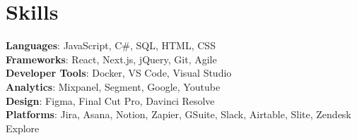 
\section{Skills}

\begin{itemize}[leftmargin=0.15in, label={}]
    \small{
      \item{
      \textbf{Languages}{: JavaScript, C\#, SQL, HTML, CSS} \\
      \textbf{Frameworks}{: React, Next.js, jQuery, Git, Agile} \\
      \textbf{Developer Tools}{: Docker, VS Code, Visual Studio} \\
      \textbf{Analytics}{: Mixpanel, Segment, Google, Youtube} \\
      \textbf{Design}{: Figma, Final Cut Pro, Davinci Resolve} \\
      \textbf{Platforms}{: Jira, Asana, Notion, Zapier, GSuite, Slack, Airtable, Slite, Zendesk Explore} \\
      }
    }
  \end{itemize}
